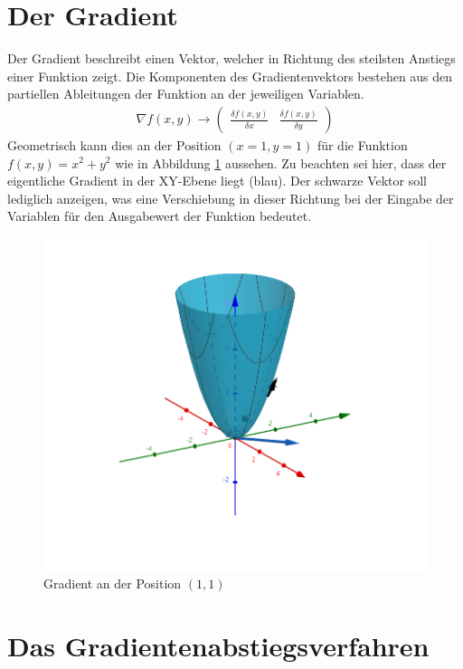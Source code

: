 \section{Der Gradient}
Der Gradient beschreibt einen Vektor, welcher in Richtung des steilsten Anstiegs einer Funktion zeigt.
Die Komponenten des Gradientenvektors bestehen aus den partiellen Ableitungen der Funktion an der jeweiligen Variablen.
\begin{align}
    \nabla f(x,y) \longrightarrow \begin{pmatrix} \frac{\delta f(x,y)}{\delta x} & \frac{\delta f(x,y)}{\delta y} \end{pmatrix}
\end{align}
Geometrisch kann dies an der Position $(x = 1, y = 1)$ für die Funktion $f(x, y) = x^2 + y^2$  wie in Abbildung
\ref{fig:01_gradient} aussehen. Zu beachten sei hier, dass der eigentliche Gradient in der XY-Ebene liegt (blau).
Der schwarze Vektor soll lediglich anzeigen, was eine Verschiebung in dieser Richtung bei der Eingabe der Variablen
für den Ausgabewert der Funktion bedeutet.

\begin{figure}[h!]
    \begin{center}
        \includegraphics[width=0.6\linewidth]{../common/02_appendix/00_resources/01_gradient.png}
    \end{center}
    \caption{Gradient an der Position $(1, 1)$}
    \label{fig:01_gradient}
\end{figure}

\section{Das Gradientenabstiegsverfahren}
